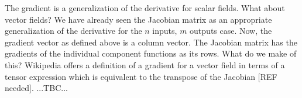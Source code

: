 \medskip
The gradient is a generalization of the derivative for scalar fields. What about vector fields? We have already seen the Jacobian matrix as an appropriate generalization of the derivative for the $n$ inputs, $m$ outputs case. Now, the gradient vector as defined above is a column vector. The Jacobian matrix has the gradients of the individual component functions as its rows. What do we make of this? Wikipedia offers a definition of a gradient for a vector field in terms of a tensor expression which is equivalent to the transpose of the Jacobian [REF needed]. ...TBC...














